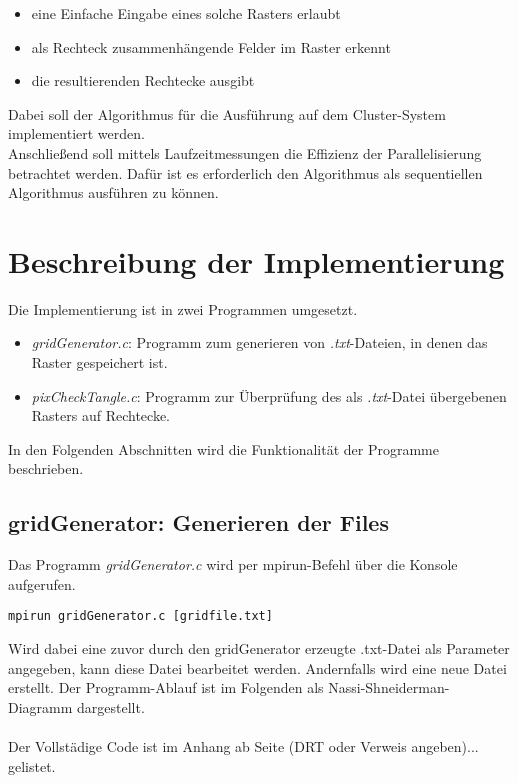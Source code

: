 \documentclass[
10pt, %
a4paper, %
oneside, %
headinclude,footinclude, %
BCOR5mm, %
]{scrartcl}
\begin{document}
\begin{itemize}[noitemsep] %
	\item eine Einfache Eingabe eines solche Rasters erlaubt
	\item als Rechteck zusammenhängende Felder im Raster erkennt 
	\item die resultierenden Rechtecke ausgibt
\end{itemize}

Dabei soll der Algorithmus für die Ausführung auf dem Cluster-System implementiert werden.\\
Anschließend soll mittels Laufzeitmessungen die Effizienz der Parallelisierung betrachtet werden. Dafür ist es erforderlich den Algorithmus als sequentiellen Algorithmus ausführen zu können.

\section{Beschreibung der Implementierung}

Die Implementierung ist in zwei Programmen umgesetzt. 

\begin{itemize}[noitemsep] %
	\item \textit{gridGenerator.c}: Programm zum generieren von \textit{.txt}-Dateien, in denen das Raster gespeichert ist.  
	\item \textit{pixCheckTangle.c}: Programm zur Überprüfung des als \textit{.txt}-Datei übergebenen Rasters auf Rechtecke.
\end{itemize}

In den Folgenden Abschnitten wird die Funktionalität der Programme beschrieben.

\subsection{gridGenerator: Generieren der Files}

Das Programm \textit{gridGenerator.c} wird per mpirun-Befehl über die Konsole aufgerufen.\\

\begin{lstlisting}
mpirun gridGenerator.c [gridfile.txt]
\end{lstlisting}

Wird dabei eine zuvor durch den gridGenerator erzeugte .txt-Datei als Parameter angegeben, kann diese Datei bearbeitet werden. Andernfalls wird eine neue Datei erstellt. Der Programm-Ablauf ist im Folgenden als Nassi-Shneiderman-Diagramm dargestellt.\\
\\Der Vollstädige Code ist im Anhang ab Seite (DRT oder Verweis angeben)... gelistet. 
\pagebreak
\end{document}
